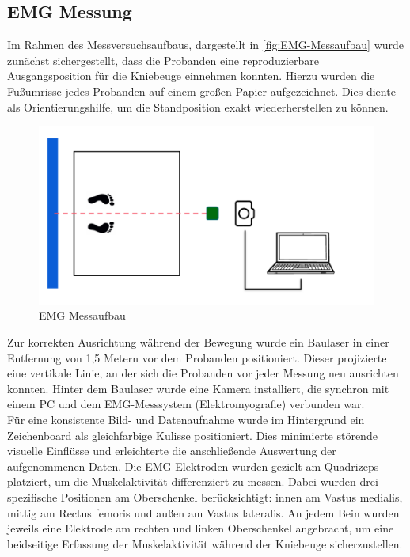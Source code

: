 \subsection{EMG Messung}
Im Rahmen des Messversuchsaufbaus, dargestellt in \autoref{fig:EMG-Messaufbau} wurde zunächst sichergestellt, dass die Probanden eine reproduzierbare Ausgangsposition für die Kniebeuge einnehmen konnten.
Hierzu wurden die Fußumrisse jedes Probanden auf einem großen Papier aufgezeichnet.
Dies diente als Orientierungshilfe, um die Standposition exakt wiederherstellen zu können.
\begin{figure}[h!]
    \centering
    \includegraphics[width=0.8\linewidth]{img/Aufbau-EMG.png}
    \caption{EMG Messaufbau}
    \label{fig:EMG-Messaufbau}
\end{figure}
Zur korrekten Ausrichtung während der Bewegung wurde ein Baulaser in einer Entfernung von 1,5 Metern vor dem Probanden positioniert.
Dieser projizierte eine vertikale Linie, an der sich die Probanden vor jeder Messung neu ausrichten konnten.
Hinter dem Baulaser wurde eine Kamera installiert, die synchron mit einem PC und dem EMG-Messsystem (Elektromyografie) verbunden war.
\\
Für eine konsistente Bild- und Datenaufnahme wurde im Hintergrund ein Zeichenboard als gleichfarbige Kulisse positioniert.
Dies minimierte störende visuelle Einflüsse und erleichterte die anschließende Auswertung der aufgenommenen Daten.
Die EMG-Elektroden wurden gezielt am Quadrizeps platziert, um die Muskelaktivität differenziert zu messen.
Dabei wurden drei spezifische Positionen am Oberschenkel berücksichtigt:
innen am Vastus medialis, mittig am Rectus femoris und außen am Vastus lateralis.
An jedem Bein wurden jeweils eine Elektrode am rechten und linken Oberschenkel angebracht, um eine beidseitige Erfassung der Muskelaktivität während der Kniebeuge sicherzustellen.
